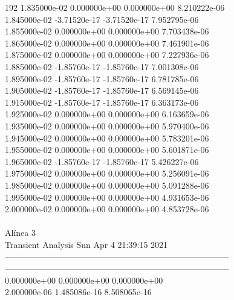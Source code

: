 192	1.835000e-02	0.000000e+00	0.000000e+00	8.210222e-06	\\ 	1.845000e-02	-3.71520e-17	-3.71520e-17	7.952795e-06	\\ 	1.855000e-02	0.000000e+00	0.000000e+00	7.703438e-06	\\ 	1.865000e-02	0.000000e+00	0.000000e+00	7.461901e-06	\\ 	1.875000e-02	0.000000e+00	0.000000e+00	7.227936e-06	\\ 	1.885000e-02	-1.85760e-17	-1.85760e-17	7.001308e-06	\\ 	1.895000e-02	-1.85760e-17	-1.85760e-17	6.781785e-06	\\ 	1.905000e-02	-1.85760e-17	-1.85760e-17	6.569145e-06	\\ 	1.915000e-02	-1.85760e-17	-1.85760e-17	6.363173e-06	\\ 	1.925000e-02	0.000000e+00	0.000000e+00	6.163659e-06	\\ 	1.935000e-02	0.000000e+00	0.000000e+00	5.970400e-06	\\ 	1.945000e-02	0.000000e+00	0.000000e+00	5.783201e-06	\\ 	1.955000e-02	0.000000e+00	0.000000e+00	5.601871e-06	\\ 	1.965000e-02	-1.85760e-17	-1.85760e-17	5.426227e-06	\\ 	1.975000e-02	0.000000e+00	0.000000e+00	5.256091e-06	\\ 	1.985000e-02	0.000000e+00	0.000000e+00	5.091288e-06	\\ 	1.995000e-02	0.000000e+00	0.000000e+00	4.931653e-06	\\ 	2.000000e-02	0.000000e+00	0.000000e+00	4.853728e-06	\\ \hline
\\ \hline
                                   Alínea 3 \\ \hline
                                   Transient Analysis  Sun Apr  4 21:39:15  2021\\ \hline
--------------------------------------------------------------------------------\\ \hline
--------------------------------------------------------------------------------\\ 	0.000000e+00	0.000000e+00	0.000000e+00	\\ 	2.000000e-06	1.485086e-16	8.508065e-16	\\ \hline
